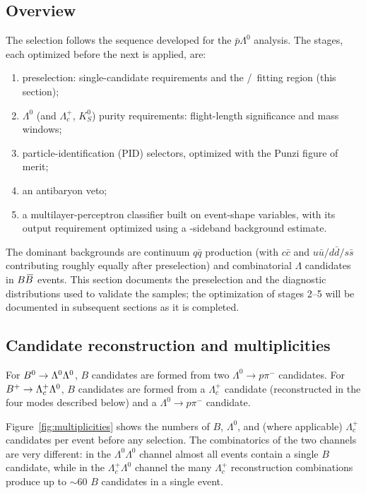 \subsection{Overview}

The selection follows the sequence developed for the
$\bar{p}\Lambda^0$ analysis. The stages, each optimized before the next
is applied, are:
%
\begin{enumerate}
    \item preselection: single-candidate requirements and the
          \mes/\DeltaE\ fitting region (this section);
    \item $\Lambda^0$ (and $\Lambda_c^+$, $K_S^0$) purity requirements:
          flight-length significance and mass windows;
    \item particle-identification (PID) selectors, optimized with the
          Punzi figure of merit;
    \item an antibaryon veto;
    \item a multilayer-perceptron classifier built on event-shape
          variables, with its output requirement optimized using a
          \DeltaE-sideband background estimate.
\end{enumerate}
%
The dominant backgrounds are continuum $q\bar{q}$ production (with
$c\bar{c}$ and $u\bar{u}/d\bar{d}/s\bar{s}$ contributing roughly equally
after preselection) and combinatorial $\Lambda$ candidates in $B\kern 0.18em\overline{\kern -0.18em B}{}$
events. This section documents the preselection and the diagnostic
distributions used to validate the samples; the optimization of stages
2--5 will be documented in subsequent sections as it is completed.

\subsection{Candidate reconstruction and multiplicities}

For $B^0 \rightarrow \Lambda^0\Lambda^0$, $B$ candidates are formed from
two $\Lambda^0 \rightarrow p \pi^-$ candidates. For
$B^+ \rightarrow \Lambda_c^+\Lambda^0$, $B$ candidates are formed from a
$\Lambda_c^+$ candidate (reconstructed in the four modes described
below) and a $\Lambda^0 \rightarrow p \pi^-$ candidate.

Figure~\ref{fig:multiplicities} shows the numbers of $B$, $\Lambda^0$,
and (where applicable) $\Lambda_c^+$ candidates per event before any
selection. The combinatorics of the two channels are very different: in
the $\Lambda^0\Lambda^0$ channel almost all events contain a single $B$
candidate, while in the $\Lambda_c^+\Lambda^0$ channel the many
$\Lambda_c^+$ reconstruction combinations produce up to $\sim$60 $B$
candidates in a single event.


